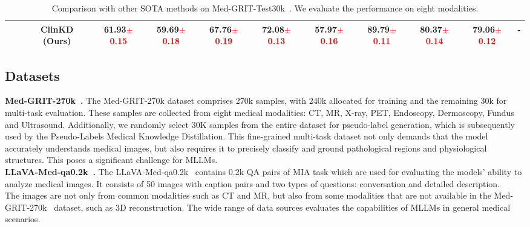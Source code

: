 \begin{table*}[t]
{\begin{tabular}{c|c|c|cccccccc|c}
\rowcolor[RGB]{255,245,235}
\cellcolor{white}\multirow{-6}{*}{\textbf{Average}} & \cellcolor{white}\multirow{-6}{*}{-} &ClinKD (Ours)& \textbf{61.93}\textcolor{red}{$\pm$0.15} & \textbf{59.69}\textcolor{red}{$\pm$0.18} & \textbf{67.76}\textcolor{red}{$\pm$0.19} & \textbf{72.08}\textcolor{red}{$\pm$0.13} & 57.97\textcolor{red}{$\pm$0.16}  & \textbf{89.79}\textcolor{red}{$\pm$0.11} & \textbf{80.37}\textcolor{red}{$\pm$0.14} & \textbf{79.06}\textcolor{red}{$\pm$0.12} & -  \\ \bottomrule
\end{tabular}%
}
\caption{Comparison with other SOTA methods on Med-GRIT-Test30k~\cite{ye2023samed2d20m, cheng2023sammed2d}. We evaluate the performance on eight modalities.}
\label{tab:detail_res}
\vspace{-1em}
\end{table*}

\subsection{Datasets}
\textbf{Med-GRIT-270k~\cite{huang2024BiRD}.} The Med-GRIT-270k dataset comprises 270k samples, with 240k allocated for training and the remaining 30k for multi-task evaluation. These samples are collected from eight medical modalities: CT, MR, X-ray, PET, Endoscopy, Dermoscopy, Fundus and Ultrasound. Additionally, we randomly select 30K samples from the entire dataset for pseudo-label generation, which is subsequently used by the Pseudo-Labels Medical Knowledge Distillation. This fine-grained multi-task dataset not only demands that the model accurately understands medical images, but also requires it to precisely classify and ground pathological regions and physiological structures. This poses a significant challenge for MLLMs. \\
\textbf{LLaVA-Med-qa0.2k~\cite{zhang2025biomedclipmultimodalbiomedicalfoundation}.} The LLaVA-Med-qa0.2k~\cite{zhang2025biomedclipmultimodalbiomedicalfoundation} contains 0.2k QA pairs of MIA task which are used for evaluating the models' ability to analyze medical images. It consists of 50 images with caption pairs and two types of questions: conversation and detailed description. \\ The images are not only from common modalities such as CT and MR, but also from some modalities that are not available in the Med-GRIT-270k~\cite{huang2024BiRD} dataset, such as 3D reconstruction. The wide range of data sources evaluates the capabilities of MLLMs in general medical scenarios.

